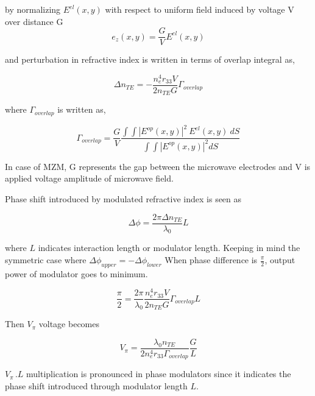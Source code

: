 \documentclass[thesis]{deutez}
\begin{document}
    by normalizing $E^{el}(x,y)$ with respect to uniform field induced by voltage V over distance G $$e_z(x,y) = \frac{G}{V}E^{el}(x,y)$$ 

    and perturbation in refractive index is written in terms of overlap integral as,
    
    \begin{equation}
        \Delta n_{TE} = - \frac{n_e^4r_{33}V}{2n_{TE}G} \Gamma_{overlap}
        \label{eq:overlap-der4}
    \end{equation}

    where $\Gamma_{overlap}$ is written as,

    \begin{equation}
        \Gamma_{overlap} = \frac{G}{V}\frac{\int \int |E^{op}(x,y)|^2 \: E^{el}(x,y)\: dS}{\int\int |E^{op}(x,y)|^2 dS}
        \label{eq:overlap-der-final}
    \end{equation}

    In case of MZM, G represents the gap between the microwave electrodes and V is applied voltage amplitude of  microwave field. 

    Phase shift introduced by modulated refractive index is seen as 

    \begin{equation}
        \Delta \phi = \frac{2\pi\Delta n_{TE}}{\lambda_0} L
       \label{eq:phase-change} 
    \end{equation}

    where $L$ indicates interaction length or modulator length. Keeping in mind the symmetric case where $\Delta\phi_{upper}=-\Delta\phi_{lower}$ When phase difference is $\frac{\pi}{2}$, output power of modulator goes to minimum. 
    
    \begin{equation}
        \frac{\pi}{2} = \frac{2\pi}{\lambda_0} \frac{n_e^4r_{33}V}{2n_{TE}G} \Gamma_{overlap} L
       \label{eq:phase-change-2} 
    \end{equation}

    Then $V_\pi$ voltage becomes

    \begin{equation}
        V_\pi = \frac{\lambda_0 n_{TE}}{2n_e^4r_{33}\Gamma_{overlap}}\frac{G}{L}
    \end{equation}

    $V_\pi\,.L$ multiplication is pronounced in phase modulators since it indicates the phase shift introduced through modulator length $L$.
    
\end{document}
